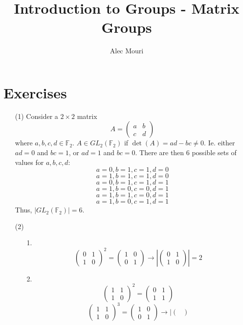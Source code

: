 \documentclass[12pt]{article}
\begin{document}
\title{Introduction to Groups - Matrix Groups}
\author{Alec Mouri}

\maketitle
\section*{Exercises}
\begin{itemize}
\item[(1)]
Consider a $2 \times 2$ matrix
$$A = \begin{pmatrix}
a & b \\
c & d
\end{pmatrix}$$
where $a, b, c, d \in \mathbb{F}_2$. $A \in GL_2(\mathbb{F}_2)$ if $\det(A) = ad - bc \neq 0$. Ie. either $ad = 0$ and $bc = 1$, or $ad = 1$ and $bc = 0$. There are then 6 possible sets of values for $a, b, c, d$:
$$a = 0, b = 1, c = 1, d = 0$$
$$a = 1, b = 1, c = 1, d = 0$$
$$a = 0, b = 1, c = 1, d = 1$$
$$a = 1, b = 0, c = 0, d = 1$$
$$a = 1, b = 1, c = 0, d = 1$$
$$a = 1, b = 0, c = 1, d = 1$$
Thus, $|GL_2(\mathbb{F}_2)| = 6$.
\item[(2)]
\begin{itemize}
\item[1.]
$$\begin{pmatrix}
0 & 1 \\
1 & 0
\end{pmatrix}^2 = \begin{pmatrix}
1 & 0 \\
0 & 1
\end{pmatrix} \rightarrow \left| \begin{pmatrix}
0 & 1 \\
1 & 0
\end{pmatrix} \right| = 2$$
\item[2.]
$$\begin{pmatrix}
1 & 1 \\
1 & 0
\end{pmatrix}^2 = \begin{pmatrix}
0 & 1 \\
1 & 1
\end{pmatrix}$$
$$\begin{pmatrix}
1 & 1 \\
1 & 0
\end{pmatrix}^3 = \begin{pmatrix}
1 & 0 \\
0 & 1
\end{pmatrix} \rightarrow \left| \begin{pmatrix}

\end{pmatrix}$$
\end{itemize}
\end{itemize}
\end{document}
